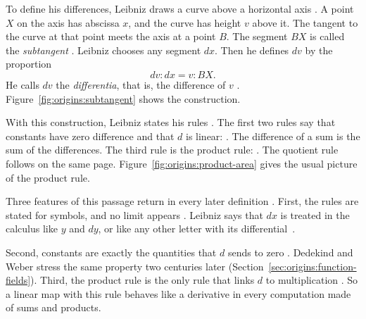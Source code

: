 To define his differences, Leibniz draws a curve above a horizontal axis \cite[p.~467]{Leibniz1684}.
A point $X$ on the axis has abscissa $x$, and the curve has height $v$ above
it. The tangent to the curve at that point meets the axis at a point $B$. The segment $BX$ is called the
\emph{subtangent} \cite[p.~467]{Leibniz1684}. Leibniz chooses any segment $dx$. Then he defines $dv$ by
the proportion
\[
  dv : dx = v : BX .
\]
He calls $dv$ the \emph{differentia}, that is, the difference of $v$ \cite[p.~467]{Leibniz1684}.
Figure~\ref{fig:origins:subtangent} shows the construction.


With this construction, Leibniz states his rules \cite[p.~467]{Leibniz1684}.
The first two rules say that constants have zero difference and that $d$ is
linear: 
\cite[p.~467]{Leibniz1684}. The difference of a sum is the sum of the
differences. The third rule is the product rule:  \cite[p.~467]{Leibniz1684}. The quotient rule follows on the
same page. Figure~\ref{fig:origins:product-area} gives the usual picture of
the product rule.


Three features of this passage return in every later definition
\cite[p.~467]{Leibniz1684}. First, the rules are stated for symbols, and no
limit appears \cite[p.~467]{Leibniz1684}. Leibniz says that $dx$ is treated in
the calculus like $y$ and $dy$, or like any other letter with its
differential~\cite[p.~467]{Leibniz1684}.

Second, constants are exactly the quantities that $d$ sends to zero
\cite[p.~467]{Leibniz1684}. Dedekind and Weber stress the same property two
centuries later (Section~\ref{sec:origins:function-fields}). Third, the
product rule is the only rule that links $d$ to multiplication
\cite[p.~467]{Leibniz1684}. So a linear map with this rule
behaves like a derivative in every computation made of sums and products.

